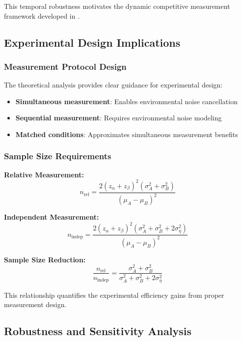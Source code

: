 This temporal robustness motivates the dynamic competitive measurement framework developed in \paperfour.

\subsection{Experimental Design Implications}

\subsubsection{Measurement Protocol Design}

The theoretical analysis provides clear guidance for experimental design:
\begin{itemize}
\item \textbf{Simultaneous measurement}: Enables environmental noise cancellation
\item \textbf{Sequential measurement}: Requires environmental noise modeling
\item \textbf{Matched conditions}: Approximates simultaneous measurement benefits
\end{itemize}

\subsubsection{Sample Size Requirements}

\textbf{Relative Measurement:}
\begin{equation}
n_{\text{rel}} = \frac{2(z_\alpha + z_\beta)^2 (\sigma_A^2 + \sigma_B^2)}{(\mu_A - \mu_B)^2}
\end{equation}

\textbf{Independent Measurement:}
\begin{equation}
n_{\text{indep}} = \frac{2(z_\alpha + z_\beta)^2 (\sigma_A^2 + \sigma_B^2 + 2\sigma_\eta^2)}{(\mu_A - \mu_B)^2}
\end{equation}

\textbf{Sample Size Reduction:}
\begin{equation}
\frac{n_{\text{rel}}}{n_{\text{indep}}} = \frac{\sigma_A^2 + \sigma_B^2}{\sigma_A^2 + \sigma_B^2 + 2\sigma_\eta^2}
\end{equation}

This relationship quantifies the experimental efficiency gains from proper measurement design.

\subsection{Robustness and Sensitivity Analysis}

